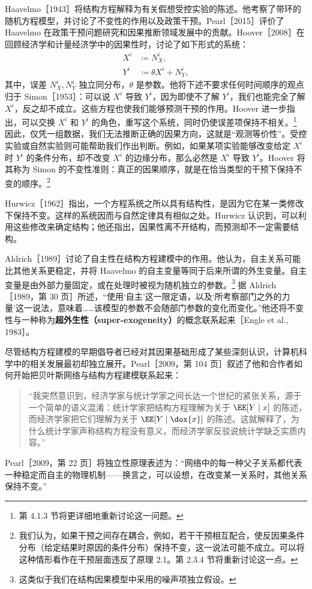 Haavelmo［1943］将结构方程解释为有关假想受控实验的陈述。他考察了带环的随机方程模型，并讨论了不变性的作用以及政策干预。Pearl［2015］评价了 Haavelmo 在政策干预问题研究和因果推断领域发展中的贡献。Hoover［2008］在回顾经济学和计量经济学中的因果性时，讨论了如下形式的系统：
\[
 \begin{aligned}
 X^i&\coloneqq N_X^i,\\
 Y^i&\coloneqq \theta X^i+N_Y^i,
 \end{aligned}
\]
其中，误差 $N_X^i,N_Y^i$ 独立同分布，$\theta$ 是参数。他将下述不要求任何时间顺序的观点归于 Simon［1953］：可以说 $X^i$ 导致 $Y^i$，因为即使不了解 $Y^i$，我们也能完全了解 $X^i$，反之却不成立。这些方程也使我们能够预测干预的作用。Hoover 进一步指出，可以交换 $X^i$ 和 $Y^i$ 的角色，重写这个系统，同时仍使误差项保持不相关。\footnote{第 4.1.3 节将更详细地重新讨论这一问题。}
因此，仅凭一组数据，我们无法推断正确的因果方向，这就是“观测等价性”。受控实验或自然实验则可能帮助我们作出判断。例如，如果某项实验能够改变给定 $X^i$ 时 $Y^i$ 的条件分布，却不改变 $X^i$ 的边缘分布，那么必然是 $X^i$ 导致 $Y^i$。Hoover 将其称为 Simon 的不变性准则：真正的因果顺序，就是在恰当类型的干预下保持不变的顺序。\footnote{我们认为，如果干预之间存在耦合，例如，若干干预相互配合，使反因果条件分布（给定结果时原因的条件分布）保持不变，这一说法可能不成立。可以将这种情形看作在干预层面违反了原理 2.1。第 2.3.4 节将重新讨论这一点。}

Hurwicz［1962］指出，一个方程系统之所以具有结构性，是因为它在某一类修改下保持不变。这样的系统因而与自然定律具有相似之处。Hurwicz 认识到，可以利用这些修改来确定结构；他还指出，因果性离不开结构，而预测却不一定需要结构。

Aldrich［1989］讨论了自主性在结构方程建模中的作用。他认为，自主关系可能比其他关系更稳定，并将 Haavelmo 的自主变量等同于后来所谓的外生变量。自主变量是由外部力量固定，或在处理时被视为随机独立的参数。\footnote{这类似于我们在结构因果模型中采用的噪声项独立假设。}
据 Aldrich［1989，第 30 页］所述，“使用‘自主’这一限定语，以及‘所考察部门之外的力量’这一说法，意味着……该模型的参数不会随部门参数的变化而变化。”他还将不变性与一种称为\textbf{超外生性（super-exogeneity）}的概念联系起来［Engle et al., 1983］。

尽管结构方程建模的早期倡导者已经对其因果基础形成了某些深刻认识，计算机科学中的相关发展最初却独立展开。Pearl［2009，第 104 页］叙述了他和合作者如何开始把贝叶斯网络与结构方程建模联系起来：
\begin{quote}
“我突然意识到，经济学家与统计学家之间长达一个世纪的紧张关系，源于一个简单的语义混淆：统计学家把结构方程理解为关于 $\EE[Y\mid x]$ 的陈述，而经济学家把它们理解为关于 $\EE[Y\mid \dox{x}]$ 的陈述。这就解释了，为什么统计学家声称结构方程没有意义，而经济学家反驳说统计学缺乏实质内容。”
\end{quote}
Pearl［2009，第 22 页］将独立性原理表述为：“网络中的每一种父子关系都代表一种稳定而自主的物理机制——换言之，可以设想，在改变某一关系时，其他关系保持不变。”


